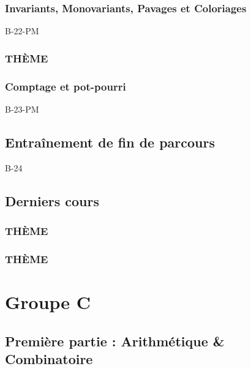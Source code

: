 \documentclass[poly,trombi]{valbonne}
\begin{document}
\subsection{Invariants, Monovariants, Pavages et Coloriages}

{B-22-PM}

\subsection{THÈME}


\subsection{Comptage et pot-pourri}

{B-23-PM}


\section{Entraînement de fin de parcours}

{B-24}


\section{Derniers cours}

\subsection{THÈME}


\subsection{THÈME}







\chapter{Groupe C}

\minitoc \clearpage

\section{Première partie : Arithmétique \& Combinatoire}
\end{document}
